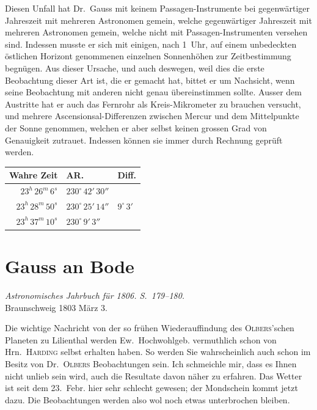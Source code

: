 \documentclass[11pt,a4paper]{book}
\begin{document}
Diesen Unfall hat Dr.~Gauss mit keinem Passagen-Instrumente bei gegenwärtiger Jahreszeit mit mehreren Astronomen gemein, welche gegenwärtiger Jahreszeit mit mehreren Astronomen gemein, welche nicht mit Passagen-Instrumenten versehen sind. Indessen musste er sich mit einigen, nach 1~Uhr, auf einem unbedeckten östlichen Horizont genommenen einzelnen Sonnenhöhen zur Zeitbestimmung begnügen. Aus dieser Ursache, und auch deswegen, weil dies die erste Beobachtung dieser Art ist, die er gemacht hat, bittet er um Nachsicht, wenn seine Beobachtung mit anderen nicht genau übereinstimmen sollte. Ausser dem Austritte hat er auch das Fernrohr als Kreis-Mikrometer zu brauchen versucht, und mehrere Ascensionsal-Differenzen zwischen Mercur und dem Mittelpunkte der Sonne genommen, welchen er aber selbst keinen grossen Grad von Genauigkeit zutrauet. Indessen können sie immer durch Rechnung geprüft werden.

\begin{center}
\begin{tabular}{r@{\quad}l@{\quad}l}
Wahre Zeit & AR. & Diff. \\
\midrule
$23^{h}\,26^{m}\,6^{s}$ & $230^{\circ}\,42'\,30''$ & \\
$23^{h}\,28^{m}\,50^{s}$ & $230^{\circ}\,25'\,14''$ & $9^{\circ}\,3'$ \\
$23^{h}\,37^{m}\,10^{s}$ & $230^{\circ}\,9'\,3''$ & \\
\bottomrule
\end{tabular}
\end{center}

\chapter*{Gauss an Bode}

\begin{center}
\textit{Astronomisches Jahrbuch für 1806. S.~179--180.}\\[1em]
Braunschweig 1803 März 3.
\end{center}

Die wichtige Nachricht von der so frühen Wiederauffindung des \textsc{Olbers}'schen Planeten zu Lilienthal werden Ew.~Hochwohlgeb. vermuthlich schon von Hrn.~\textsc{Harding} selbst erhalten haben. So werden Sie wahrscheinlich auch schon im Besitz von Dr.~\textsc{Olbers} Beobachtungen sein. Ich schmeichle mir, dass es Ihnen nicht unlieb sein wird, auch die Resultate davon näher zu erfahren. Das Wetter ist seit dem 23.~Febr. hier sehr schlecht gewesen; der Mondschein kommt jetzt dazu. Die Beobachtungen werden also wol noch etwas unterbrochen bleiben.
\end{document}
